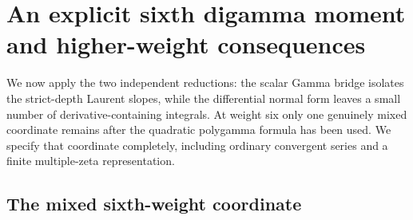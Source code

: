 \section[An explicit sixth digamma moment and higher-weight consequences]{An explicit sixth digamma moment\\and higher-weight consequences}
\label{sixth:sec}

We now apply the two independent reductions: the scalar Gamma bridge
isolates the strict-depth Laurent slopes, while the differential normal
form leaves a small number of derivative-containing integrals.
At weight six only one genuinely mixed coordinate remains after the
quadratic polygamma formula has been used.  We specify that coordinate
completely, including ordinary convergent series and a finite
multiple-zeta representation.

\subsection{The mixed sixth-weight coordinate}


